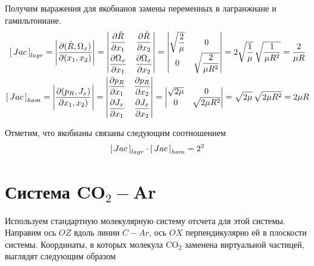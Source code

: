 \documentclass[12pt]{article}
\newcommand{\dR}{\dot{R}}
\newcommand{\JacL}{\left[ \, Jac \, \right]_{lagr}}
\newcommand{\JacH}{\left[ \, Jac \, \right]_{ham}}
\begin{document}
Получим выражения для якобианов замены переменных в лагранжиане и гамильтониане. 
\begin{gather}
		\left[ \, Jac \, \right]_{lagr} = \Bigg{|} \frac{\partial ( \dR, \Omega_x )}{\partial ( x_1, x_2 )} \Bigg{|}  =  
	\begin{vmatrix}
			\displaystyle \frac{\partial \dR}{\partial x_1} & \displaystyle \frac{\partial \dR}{\partial x_2} \\[2ex]
		\displaystyle \frac{\partial \Omega_x}{\partial x_1} & \displaystyle \frac{\partial \Omega_x}{\partial x_2}
\end{vmatrix} =
\begin{vmatrix}
		\displaystyle \sqrt{\frac{2}{\mu}} & 0 \\
	0 & \displaystyle \sqrt{\frac{2}{\mu R^2}}
\end{vmatrix} = 2 \sqrt{\frac{1}{\mu}} \, \sqrt{\frac{1}{\mu R^2}} = \frac{2}{\mu R} \notag \\
\left[ \, Jac \, \right]_{ham} = \Bigg{|} \frac{\partial ( p_R, J_x )}{\partial x_1, x_2 )} \Bigg{|} = 
\begin{vmatrix}
		\displaystyle \frac{\partial p_R}{\partial x_1} & \displaystyle \frac{\partial p_R}{\partial x_2} \\[2ex]
	\displaystyle \frac{\partial J_x}{\partial x_1} & \displaystyle \frac{\partial J_x}{\partial x_2}
\end{vmatrix} =
\begin{vmatrix}
	\sqrt{2 \mu} & 0 \\
	0 & \sqrt{2 \mu R^2}
\end{vmatrix} = \sqrt{2 \mu} \, \sqrt{2 \mu R^2} = 2 \mu R \notag
\end{gather}

Отметим, что якобианы связаны следующим соотношением
\begin{gather}
	\JacL \cdot \JacH = 2^2 \notag	
\end{gather}

\section{Система CO$_2-$Ar}

Используем стандартную молекулярную систему отсчета для этой системы. Направим ось $OZ$ вдоль линии $C-Ar$, ось $OX$ перпендикулярно ей в плоскости системы. Координаты, в которых молекула CO$_2$ заменена виртуальной частицей, выглядят следующим образом
\end{document}
